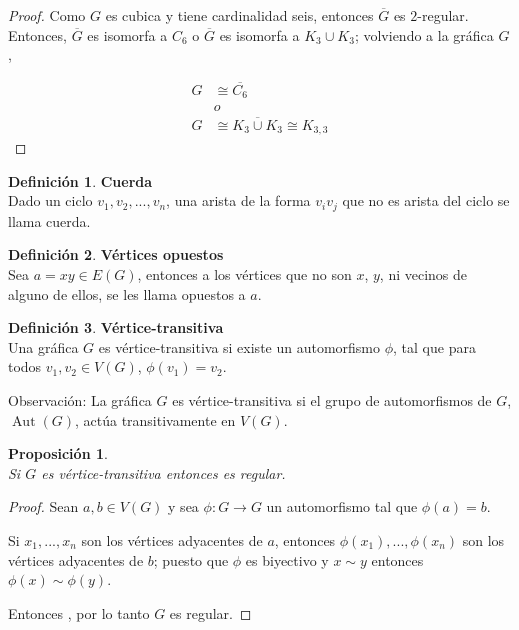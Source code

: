 \documentclass[12pt]{book}
\newtheorem{proposition}{Proposición}
\theoremstyle{definition}
\newtheorem{definition}{Definición}
\DeclareMathOperator{\Aut}{Aut}
\begin{document}
\begin{proof} Como $G$ es cubica y tiene cardinalidad seis, entonces
$\overline{G}$ es $2$-regular. Entonces, $\overline{G}$ es isomorfa a $C_6$ o
$\overline{G}$ es isomorfa a $K_3\cup K_3$; volviendo a la gráfica $G$,

\begin{equation*}
  \begin{split}
    G&\cong \overline{C_6}\\
    &       o\\
    G&\cong \overline{K_3\cup K_3} \cong K_{3,3}
  \end{split}
\end{equation*}
\end{proof}
 

\begin{definition}\textbf{ Cuerda}\\
  Dado un ciclo $v_1, v_2,..., v_n$, una arista de la forma $v_iv_j$
  que no es arista del ciclo se llama cuerda.
\end{definition}



\begin{definition}\textbf{Vértices opuestos}\\
  Sea $a=xy \in E(G)$, entonces a los vértices que no son $x$, $y$, ni
  vecinos de alguno de ellos, se les llama opuestos a $a$.
\end{definition}




\begin{definition}\textbf{Vértice-transitiva}\\
  Una gráfica $G$ es vértice-transitiva si existe un
  automorfismo $\phi$, tal que para todos $v_1, v_2 \in V(G)$,
  $\phi(v_1)= v_2 $.
\end{definition}

Observación: La gráfica $G$ es vértice-transitiva si el grupo de
automorfismos de $G$, $\Aut(G)$, actúa transitivamente en
$V(G)$.

\begin{proposition}\textbf{}\\
  Si $G$ es vértice-transitiva entonces es regular.
\end{proposition}

\begin{proof} Sean $a,b \in V(G)$ y sea $\phi:G\rightarrow G$ un
automorfismo tal que $\phi(a)=b$.

 Si ${x_1,...,x_n}$ son los vértices adyacentes
de $a$, entonces $\phi(x_1),...,\phi(x_n)$ son los vértices adyacentes de $b$;
puesto que $\phi$ es biyectivo y $x\sim y$ entonces $\phi(x)\sim
\phi(y)$.

Entonces , por lo
tanto $G$ es regular.
\end{proof}
\end{document}
